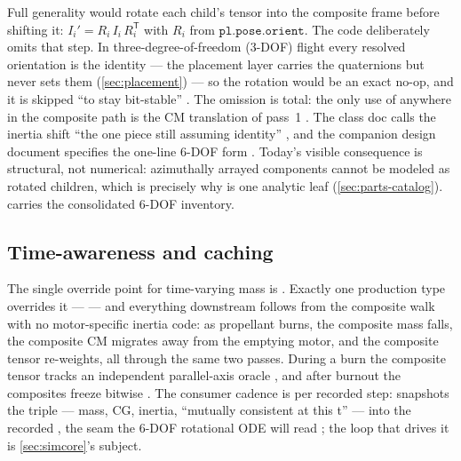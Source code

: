 \begin{keyinsight}
Full generality would rotate each child's tensor into the composite frame before shifting it:
$I_i' = R_i\, I_i\, R_i^{\mathsf{T}}$ with $R_i$ from $\mathtt{pl.pose.orient}$. The code
deliberately omits that step. In three-degree-of-freedom (3-DOF) flight every resolved
orientation is the identity --- the placement layer carries the quaternions but never sets
them (\cref{sec:placement}) --- so the rotation would be an exact no-op, and it is skipped
``to stay bit-stable'' . The omission is total: the only use of
 anywhere in the composite path is the CM translation of pass~1
. The class doc calls the inertia shift ``the one piece still
assuming identity'' , and the companion design document specifies
the one-line 6-DOF form . Today's
visible consequence is
structural, not numerical: azimuthally arrayed components cannot be modeled as rotated
children, which is precisely why  is one analytic leaf
(\cref{sec:parts-catalog}).  carries the consolidated 6-DOF inventory.
\end{keyinsight}

\subsection{Time-awareness and caching}\label{sec:parts-caching}

The single override point for time-varying mass is 
. Exactly one production type overrides it --- 
 --- and everything downstream follows from the composite walk
with no motor-specific inertia code: as propellant burns, the composite mass falls, the
composite CM migrates away from the emptying motor, and the composite tensor re-weights, all
through the same two passes. During a burn the composite tensor tracks an independent
parallel-axis oracle , and after burnout the composites
freeze bitwise . The consumer cadence is per recorded
step:  snapshots the triple --- mass, CG,
inertia, ``mutually consistent at this t'' --- into the recorded 
, the seam the 6-DOF rotational ODE will read
; the loop that drives it is \cref{sec:simcore}'s subject.

